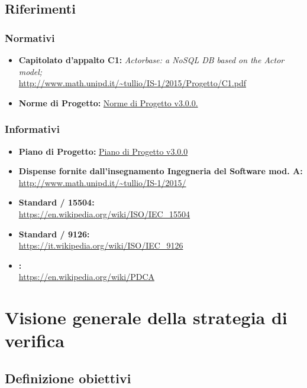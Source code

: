 \documentclass{scalatekids-article}
\begin{document}
\subsection{Riferimenti}
\subsubsection{Normativi}
\begin{itemize}
\item\textbf{Capitolato d'appalto C1:} \textit{Actorbase: a NoSQL DB based on the Actor model;}\\
  \url{http://www.math.unipd.it/~tullio/IS-1/2015/Progetto/C1.pdf}
\item\textbf{Norme di Progetto:} \href{run:../Interni/NormeDiProgetto\_v3.0.0.pdf}{Norme di Progetto v3.0.0.}
\end{itemize}
\subsubsection{Informativi}
\begin{itemize}
\item\textbf{Piano di Progetto:} \href{run:./PianoDiProgetto\_v3.0.0.pdf}{Piano di Progetto v3.0.0}
\item\textbf{Dispense fornite dall'insegnamento Ingegneria del Software mod. A:}\\
  \url{http://www.math.unipd.it/~tullio/IS-1/2015/}
\item\textbf{Standard / 15504:}\\
\url{https://en.wikipedia.org/wiki/ISO/IEC_15504}
\item\textbf{Standard / 9126:}\\
\url{https://it.wikipedia.org/wiki/ISO/IEC_9126}
\item\textbf{:}\\
\url{https://en.wikipedia.org/wiki/PDCA}
\end{itemize}
\newpage
\section{Visione generale della strategia di verifica}
\subsection{Definizione obiettivi}
\end{document}
